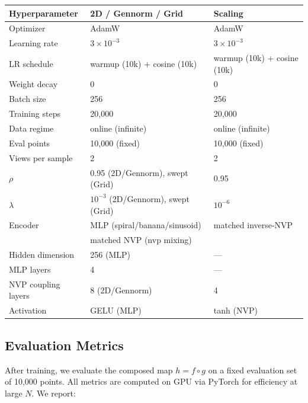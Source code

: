 \begin{center}
\renewcommand{\arraystretch}{1.2}
\begin{tabular}{lll}
\hline
\textbf{Hyperparameter} & \textbf{2D / Gennorm / Grid} & \textbf{Scaling} \\
\hline
Optimizer & AdamW & AdamW \\
Learning rate & $3 \times 10^{-3}$ & $3 \times 10^{-3}$ \\
LR schedule & warmup (10k) + cosine (10k) & warmup (10k) + cosine (10k) \\
Weight decay & 0 & 0 \\
Batch size & 256 & 256 \\
Training steps & 20{,}000 & 20{,}000 \\
Data regime & online (infinite) & online (infinite) \\
Eval points & 10{,}000 (fixed) & 10{,}000 (fixed) \\
Views per sample & 2 & 2 \\
$\rho$ & 0.95 (2D/Gennorm), swept (Grid) & 0.95 \\
$\lambda$ & $10^{-3}$ (2D/Gennorm), swept (Grid) & $10^{-6}$ \\
Encoder & MLP (spiral/banana/sinusoid) & matched inverse-NVP \citep{dinh2016density} \\
 & matched NVP (nvp mixing) & \\
Hidden dimension & 256 (MLP) & --- \\
MLP layers & 4 & --- \\
NVP coupling layers & 8 (2D/Gennorm) & 4 \\
Activation & GELU (MLP) & tanh (NVP) \\
\hline
\end{tabular}
\end{center}

\subsection{Evaluation Metrics}

After training, we evaluate the composed map $h = f \circ g$ on a fixed evaluation set of 10{,}000 points. All metrics are computed on GPU via PyTorch for efficiency at large $N$. We report:

